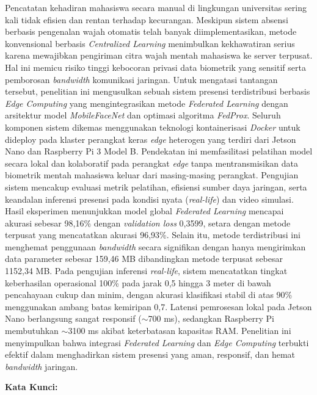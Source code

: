 Pencatatan kehadiran mahasiswa secara manual di lingkungan universitas sering kali tidak efisien dan rentan terhadap kecurangan. Meskipun sistem absensi berbasis pengenalan wajah otomatis telah banyak diimplementasikan, metode konvensional berbasis \textit{Centralized Learning} menimbulkan kekhawatiran serius karena mewajibkan pengiriman citra wajah mentah mahasiswa ke server terpusat. Hal ini memicu risiko tinggi kebocoran privasi data biometrik yang sensitif serta pemborosan \textit{bandwidth} komunikasi jaringan. Untuk mengatasi tantangan tersebut, penelitian ini mengusulkan sebuah sistem presensi terdistribusi berbasis \textit{Edge Computing} yang mengintegrasikan metode \textit{Federated Learning} dengan arsitektur model \textit{MobileFaceNet} dan optimasi algoritma \textit{FedProx}. Seluruh komponen sistem dikemas menggunakan teknologi kontainerisasi \textit{Docker} untuk dideploy pada klaster perangkat keras \textit{edge} heterogen yang terdiri dari Jetson Nano dan Raspberry Pi 3 Model B. Pendekatan ini memfasilitasi pelatihan model secara lokal dan kolaboratif pada perangkat \textit{edge} tanpa mentransmisikan data biometrik mentah mahasiswa keluar dari masing-masing perangkat. Pengujian sistem mencakup evaluasi metrik pelatihan, efisiensi sumber daya jaringan, serta keandalan inferensi presensi pada kondisi nyata (\textit{real-life}) dan video simulasi. Hasil eksperimen menunjukkan model global \textit{Federated Learning} mencapai akurasi sebesar 98,16\% dengan \textit{validation loss} 0,3599, setara dengan metode terpusat yang mencatatkan akurasi 96,93\%. Selain itu, metode terdistribusi ini menghemat penggunaan \textit{bandwidth} secara signifikan dengan hanya mengirimkan data parameter sebesar 159,46 MB dibandingkan metode terpusat sebesar 1152,34 MB. Pada pengujian inferensi \textit{real-life}, sistem mencatatkan tingkat keberhasilan operasional 100\% pada jarak 0,5 hingga 3 meter di bawah pencahayaan cukup dan minim, dengan akurasi klasifikasi stabil di atas 90\% menggunakan ambang batas kemiripan 0,7. Latensi pemrosesan lokal pada Jetson Nano berlangsung sangat responsif ($\sim$700 ms), sedangkan Raspberry Pi membutuhkan $\sim$3100 ms akibat keterbatasan kapasitas RAM. Penelitian ini menyimpulkan bahwa integrasi \textit{Federated Learning} dan \textit{Edge Computing} terbukti efektif dalam menghadirkan sistem presensi yang aman, responsif, dan hemat \textit{bandwidth} jaringan.

\textbf{Kata Kunci: \keywords{}}
